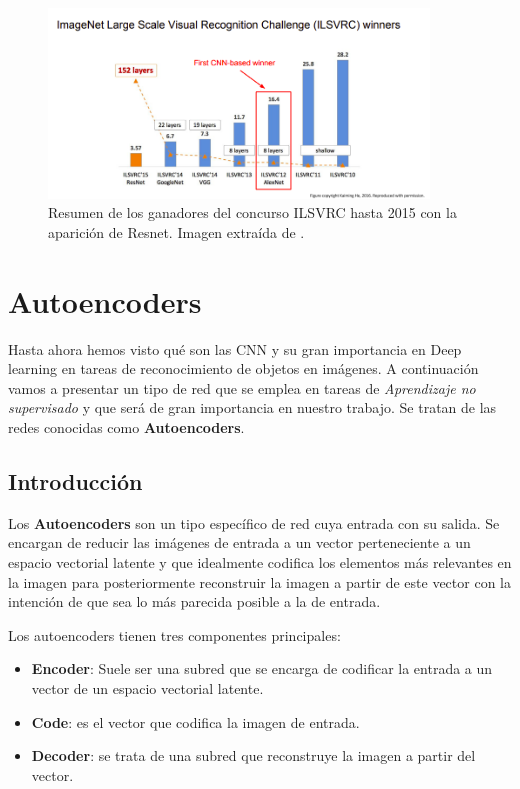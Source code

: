             \begin{figure}[!h]
                \centering
                \includegraphics[width=0.9\textwidth]{img/ImageNet.png}
                \caption{Resumen de los ganadores del concurso ILSVRC hasta 2015 con la aparición de Resnet. Imagen extraída de \cite{StanfordCourse}.}
                \label{fig:ImageNet}
            \end{figure}

\section{Autoencoders}
    \noindent Hasta ahora hemos visto qué son las CNN y su gran importancia en Deep learning en tareas de reconocimiento de objetos en imágenes. A continuación vamos a presentar un tipo de red que se emplea en tareas de \textit{Aprendizaje no supervisado} y que será de gran importancia en nuestro trabajo. Se tratan de las redes conocidas como \textbf{Autoencoders}.

    \subsection{Introducción}
        \noindent Los \textbf{Autoencoders} \cite{autoencoders2017} son un tipo específico de red cuya entrada  con su salida. Se encargan de reducir las imágenes de entrada a un vector perteneciente a un espacio vectorial latente y que idealmente codifica los elementos más relevantes en la imagen para posteriormente reconstruir la imagen a partir de este vector con la intención de que sea lo más parecida posible a la de entrada.

        \medskip

        \noindent Los autoencoders tienen tres componentes principales: 

        \begin{itemize}
            \item \textbf{Encoder}: Suele ser una subred que se encarga de codificar la entrada a un vector de un espacio vectorial latente. 
            \item \textbf{Code}: es el vector que codifica la imagen de entrada. 
            \item \textbf{Decoder}: se trata de una subred que reconstruye la imagen a partir del vector.
        \end{itemize}

